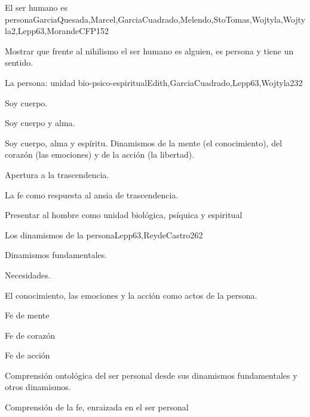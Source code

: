 \begin{syllabus}
\begin{unit}{El ser humano es persona}{GarciaQuesada,Marcel,GarciaCuadrado,Melendo,StoTomas,Wojtyla,Wojtyla2,Lepp63,MorandeCFP}{15}{2}
\begin{learningoutcomes}
	\item Mostrar que frente al nihilismo el ser humano es alguien, es persona y tiene un sentido.
\end{learningoutcomes}
\end{unit}

\begin{unit}{La persona: unidad bio-psico-espiritual}{Edith,GarciaCuadrado,Lepp63,Wojtyla2}{3}{2}
\begin{topics}
 		\item Soy cuerpo.
 		\item Soy cuerpo y alma.
 		\item Soy cuerpo, alma y espíritu.  Dinamismos de la mente (el conocimiento), del corazón (las emociones) y de la acción (la libertad).
 		\item Apertura a la trascendencia.
 		\item La fe como respuesta al ansia de trascendencia.
\end{topics}

\begin{learningoutcomes}
	\item Presentar al hombre como unidad biológica, psíquica y espiritual
\end{learningoutcomes}
\end{unit}

\begin{unit}{Los dinamismos de la persona}{Lepp63,ReydeCastro2}{6}{2}
\begin{topics}
 	 		\item Dinamismos fundamentales.
 	 		\item Necesidades.
 	 		\item El conocimiento, las emociones y la acción como actos de la persona.
 	 		\item Fe de mente
 	 		\item Fe de corazón
 	 		\item Fe de acción
\end{topics}

\begin{learningoutcomes}
	\item Comprensión ontológica del ser personal desde sus dinamismos fundamentales y otros dinamismos.
	\item Comprensión de la fe, enraizada en el ser personal

\end{learningoutcomes}
\end{unit}


\end{syllabus}
